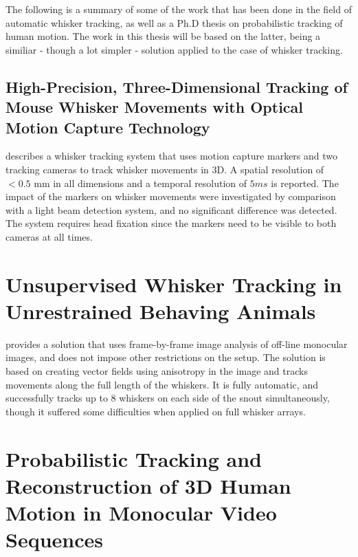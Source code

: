 The following is a summary of some of the work that has been done in
the field of automatic whisker tracking, as well as a Ph.D thesis on
probabilistic tracking of human motion. The work in this thesis will
be based on the latter, being a similiar - though a lot simpler -
solution applied to the case of whisker tracking.


\subsection{High-Precision, Three-Dimensional Tracking of Mouse
  Whisker Movements with Optical Motion Capture Technology}

\cite{BadExample1} describes a whisker tracking system that uses
motion capture markers and two tracking cameras to track whisker
movements in 3D. A spatial resolution of $<0.5$ mm in all dimensions
and a temporal resolution of $5 ms$ is reported. The impact of the
markers on whisker movements were investigated by comparison with a
light beam detection system, and no significant difference was
detected. The system requires head fixation since the markers need to
be visible to both cameras at all times.
        

\section{Unsupervised Whisker Tracking in Unrestrained Behaving
  Animals}

\cite{UnsupervisedTracking} provides a solution that uses
frame-by-frame image analysis of off-line monocular images, and does
not impose other restrictions on the setup. The solution is based on
creating vector fields using anisotropy in the image and tracks
movements along the full length of the whiskers. It is fully
automatic, and successfully tracks up to 8 whiskers on each side of
the snout simultaneously, though it suffered some difficulties when
applied on full whisker arrays.


\section{Probabilistic Tracking and Reconstruction of 3D Human Motion in Monocular Video Sequences\cite{Hedvig}}
    



